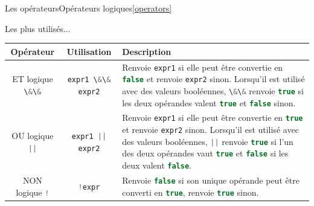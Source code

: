 \documentclass{beamer}
\begin{document}
\begin{frame}{Les opérateurs}{Opérateurs logiques\cref{operators}}
    \begin{scriptsize}
        Les plus utilisés...
        \begin{table}[h!]
            \centering
            \begin{tabular}{|c|c|p{7cm}|}
                \hline
                \textbf{Opérateur}                               & \textbf{Utilisation}                              & \textbf{Description}                                                                                                                                                                                                                                                                                                                                                                                                                                                                         \\
                \hline
                ET logique \lstinline[language=Javascript]!\&\&! & \lstinline[language=Javascript]!expr1 \&\& expr2! & Renvoie \lstinline[language=Javascript]!expr1! si elle peut être convertie en \lstinline[language=Javascript]!false! et renvoie \lstinline[language=Javascript]!expr2! sinon. Lorsqu'il est utilisé avec des valeurs booléennes, \lstinline[language=Javascript]!\&\&! renvoie \lstinline[language=Javascript]!true! si les deux opérandes valent \lstinline[language=Javascript]!true! et \lstinline[language=Javascript]!false! sinon.                                                     \\
                \hline
                OU logique \lstinline[language=Javascript]!||!   & \lstinline[language=Javascript]!expr1 || expr2!   & Renvoie \lstinline[language=Javascript]!expr1! si elle peut être convertie en \lstinline[language=Javascript]!true! et renvoie \lstinline[language=Javascript]!expr2! sinon. Lorsqu'il est utilisé avec des valeurs booléennes, \lstinline[language=Javascript]!||! renvoie \lstinline[language=Javascript]!true! si l'un des deux opérandes vaut \lstinline[language=Javascript]!true! et \lstinline[language=Javascript]!false! si les deux valent \lstinline[language=Javascript]!false!. \\
                \hline
                NON logique \lstinline[language=Javascript]|!|   & \lstinline[language=Javascript]|!expr|            & Renvoie \lstinline[language=Javascript]!false! si son unique opérande peut être converti en \lstinline[language=Javascript]!true!, renvoie \lstinline[language=Javascript]!true! sinon.                                                                                                                                                                                                                                                                                                      \\

\end{tabular}
\end{table}
\end{scriptsize}
\end{frame}
\end{document}
